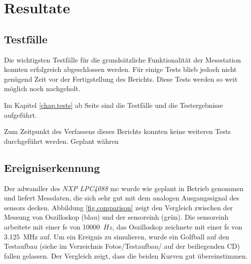 %
%

\chapter{Resultate}\label{chap.resultate}

\section{Testfälle}
Die wichtigsten Testfälle für die grundsätzliche Funktionalität der Messstation konnten erfolgreich abgeschlossen werden. Für einige Tests blieb jedoch nicht genügend Zeit vor der Fertigstellung des Berichts. Diese Tests werden so weit möglich noch nachgeholt.

Im Kapitel \ref{chap.tests} ab Seite \pageref{chap.tests} sind die Testfälle und die Testergebnisse aufgeführt.


Zum Zeitpunkt des Verfassens dieses Berichts konnten keine weiteren Tests durchgeführt werden. Geplant währen

\section{Ereigniserkennung}
Der \gls{adwandler} des \emph{NXP LPC4088} \gls{mc} wurde wie geplant in Betrieb genommen und liefert Messdaten, die sich sehr gut mit dem analogen Ausgangssignal des \gls{sensor}s decken. Abbildung \ref{fig.comparison} zeigt den Vergleich zwischen der Messung von Oszilloskop (blau) und der \gls{sensoreinh} (grün). Die \gls{sensoreinh} arbeitete mit einer \gls{fs} von 10000~\ensuremath{Hz}, das Oszilloskop zeichnete mit einer \gls{fs} von 3.125~MHz auf. Um ein Ereignis zu simulieren, wurde ein Golfball auf den Testaufbau (siehe im Verzeichnis Fotos/Testaufbau/ auf der beiliegenden CD) fallen gelassen. Der Vergleich zeigt, dass die beiden Kurven gut übereinstimmen. 


